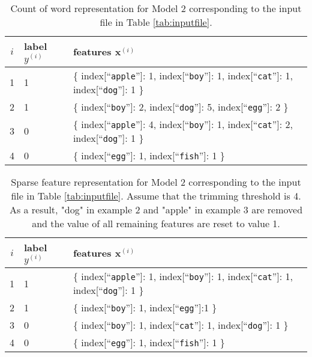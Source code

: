 \documentclass[11pt,addpoints,answers]{exam}
\newcommand{\xv}{\mathbf{x}}
\begin{document}
\begin{table}[p]
    \centering
%
\begin{tabular}{cll}
\toprule
$i$ & {\bf label} $y^{(i)}$ & {\bf features} $\xv^{(i)}$ \\
\midrule
1 & 1 &  \{ index[``{\tt apple}'']: 1, index[``{\tt boy}'']: 1, index[``{\tt cat}'']: 1, index[``{\tt dog}'']: 1 \} \\
2 & 1 & \{ index[``{\tt boy}'']: 2, index[``{\tt dog}'']: 5, index[``{\tt egg}'']: 2 \} \\
3 & 0 & \{ index[``{\tt apple}'']: 4, index[``{\tt boy}'']: 1, index[``{\tt cat}'']: 2, index[``{\tt dog}'']: 1 \} \\
4 & 0 & \{ index[``{\tt egg}'']: 1, index[``{\tt fish}'']: 1 \} \\
\bottomrule
\end{tabular}
%
    \caption{Count of word representation  for Model 2 corresponding to the input file in Table \ref{tab:inputfile}. }
    \label{tab:countofword}
\end{table}

\begin{table}[p]
    \centering
%
\begin{tabular}{cll}
\toprule
$i$ & {\bf label} $y^{(i)}$ & {\bf features} $\xv^{(i)}$ \\
\midrule
1 & 1 &  \{ index[``{\tt apple}'']: 1, index[``{\tt boy}'']: 1, index[``{\tt cat}'']: 1, index[``{\tt dog}'']: 1 \} \\
2 & 1 & \{ index[``{\tt boy}'']: 1,  index[``{\tt egg}'']:1 \} \\
3 & 0 & \{  index[``{\tt boy}'']: 1, index[``{\tt cat}'']: 1, index[``{\tt dog}'']: 1 \} \\
4 & 0 & \{ index[``{\tt egg}'']: 1, index[``{\tt fish}'']: 1 \} \\
\bottomrule
\end{tabular}
%
    \caption{Sparse feature representation for Model 2 corresponding to the input file in Table \ref{tab:inputfile}. Assume that the trimming threshold is 4. As a result, "dog" in example 2 and "apple" in example 3 are removed and the value of all remaining features are reset to value 1.}
    \label{tab:model2sparse}
\end{table}
\end{document}
